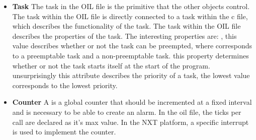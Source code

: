 \begin{itemize}
    \item{\textbf{Task}}
    The task in the OIL file is the primitive that the other objects control. The task within the OIL file is directly connected to a task within the c file, which describes the functionality of the task. The task within the OIL file describes the properties of the task. The interesting properties are: , this value describes whether or not the task can be preempted, where  corresponds to a preemptable task and  a non-preemptable task.  this property determines whether or not the task starts itself at the start of the program. 
     unsurprisingly this attribute describes the priority of a task, the lowest value corresponds to the lowest priority.
    \item{\textbf{Counter}}
    A  is a global counter that should be incremented at a fixed interval and is necessary to be able to create an alarm. In the oil file, the ticks per call are declared as it's max value. In the NXT platform, a specific interrupt  is used to implement the counter.
    

\end{itemize}
